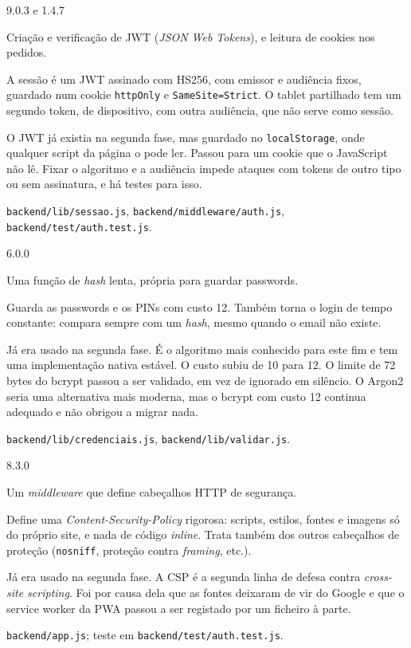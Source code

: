 \documentclass[a4paper,12pt]{article}
\newenvironment{ficha}[2]{%
  \par\needspace{7\baselineskip}\medskip\noindent{\large\bfseries #1}\hfill{\small\color{gray!70!black}#2}\par\nopagebreak\smallskip
  \begin{description}[leftmargin=3.1cm,labelwidth=2.8cm,labelsep=0.3cm,font=\normalfont\bfseries\small,itemsep=2pt,topsep=2pt,before=\raggedright]
}{\end{description}\medskip}
\begin{document}
\begin{ficha}{jsonwebtoken e cookie-parser}{9.0.3 e 1.4.7}
  \item[O que é] Criação e verificação de JWT (\textit{JSON Web Tokens}), e leitura de cookies nos pedidos.
  \item[Para que serviu] A sessão é um JWT assinado com HS256, com emissor e audiência fixos, guardado num cookie \texttt{httpOnly} e \texttt{SameSite=Strict}. O tablet partilhado tem um segundo token, de dispositivo, com outra audiência, que não serve como sessão.
  \item[Porquê] O JWT já existia na segunda fase, mas guardado no \texttt{localStorage}, onde qualquer script da página o pode ler. Passou para um cookie que o JavaScript não lê. Fixar o algoritmo e a audiência impede ataques com tokens de outro tipo ou sem assinatura, e há testes para isso.
  \item[Onde está] \texttt{backend/lib/sessao.js}, \texttt{backend/middleware/auth.js}, \texttt{backend/test/auth.test.js}.
\end{ficha}

\begin{ficha}{bcrypt}{6.0.0}
  \item[O que é] Uma função de \textit{hash} lenta, própria para guardar passwords.
  \item[Para que serviu] Guarda as passwords e os PINs com custo 12. Também torna o login de tempo constante: compara sempre com um \textit{hash}, mesmo quando o email não existe.
  \item[Porquê] Já era usado na segunda fase. É o algoritmo mais conhecido para este fim e tem uma implementação nativa estável. O custo subiu de 10 para 12. O limite de 72 bytes do bcrypt passou a ser validado, em vez de ignorado em silêncio. O Argon2 seria uma alternativa mais moderna, mas o bcrypt com custo 12 continua adequado e não obrigou a migrar nada.
  \item[Onde está] \texttt{backend/lib/credenciais.js}, \texttt{backend/lib/validar.js}.
\end{ficha}

\begin{ficha}{helmet}{8.3.0}
  \item[O que é] Um \textit{middleware} que define cabeçalhos HTTP de segurança.
  \item[Para que serviu] Define uma \textit{Content-Security-Policy} rigorosa: scripts, estilos, fontes e imagens só do próprio site, e nada de código \textit{inline}. Trata também dos outros cabeçalhos de proteção (\texttt{nosniff}, proteção contra \textit{framing}, etc.).
  \item[Porquê] Já era usado na segunda fase. A CSP é a segunda linha de defesa contra \textit{cross-site scripting}. Foi por causa dela que as fontes deixaram de vir do Google e que o service worker da PWA passou a ser registado por um ficheiro à parte.
  \item[Onde está] \texttt{backend/app.js}; teste em \texttt{backend/test/auth.test.js}.
\end{ficha}
\end{document}
